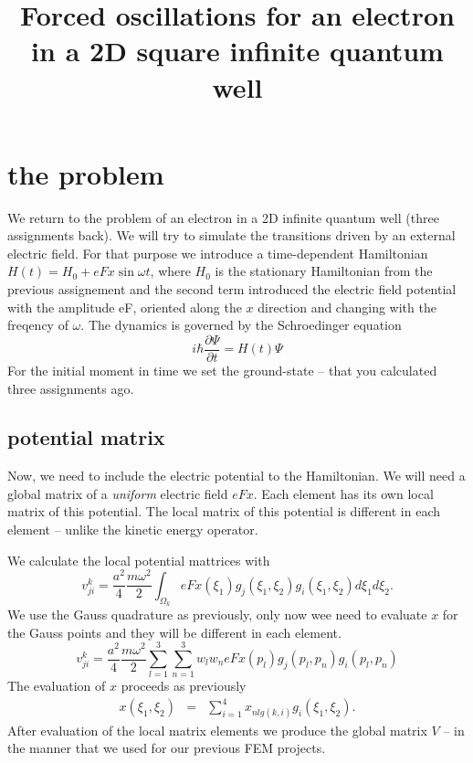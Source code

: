 \documentclass[7pt]{article}
\title{Forced oscillations for an electron in a 2D square infinite quantum well}
\begin{document}
\maketitle




\section{the problem}

We return to the problem of an electron in a 2D infinite quantum well (three assignments back).
We will try to simulate the transitions driven by an external electric field. 
For that purpose we introduce a time-dependent Hamiltonian $H(t)=H_0+eFx \sin\omega t$,
where $H_0$ is the stationary Hamiltonian from the previous assignement and the second term introduced
the electric field potential with the amplitude eF, oriented along the  $x$ direction and changing
with the freqency of $\omega$. 
The dynamics is governed by the Schroedinger equation
\begin{equation} i\hbar \frac{\partial \Psi}{\partial t}=H(t)\Psi\end{equation}
For the initial moment in time we set the ground-state -- that you calculated three assignments ago.

\subsection{potential matrix}
Now, we need to include the electric potential to the Hamiltonian. We will need a global matrix 
of a {\it uniform} electric field $eFx$. Each element has its own local matrix of this potential. The local
matrix of this potential is different in each element -- unlike the kinetic energy operator. 

We calculate the local potential mattrices with 
$$v^k_{ji}=\frac{a^2}{4} \frac{m\omega^2}{2}\int_{\Omega_k} eF x(\xi_1) g_j(\xi_1,\xi_2) g_i(\xi_1,\xi_2)d\xi_1 d\xi_2.$$
We use the Gauss quadrature as previously, only now wee need to evaluate $x$ for the Gauss points
and they will be different in each element.
$$v^k_{ji}=\frac{a^2}{4}\frac{m\omega^2}{2}\sum_{l=1}^3\sum_{n=1}^3  w_l w_n eF x(p_l) g_j(p_l,p_n) g_i(p_l,p_n)$$
The evaluation of $x$ proceeds as previously
\begin{eqnarray}
x(\xi_1,\xi_2)&=&\sum_{i=1}^4 x_{nlg(k,i)}g_i(\xi_1,\xi_2).\label{wzor} 
\end{eqnarray}
After evaluation of the local matrix elements we produce the global matrix $V$ -- in the manner that we used
for our previous FEM projects.
\end{document}
